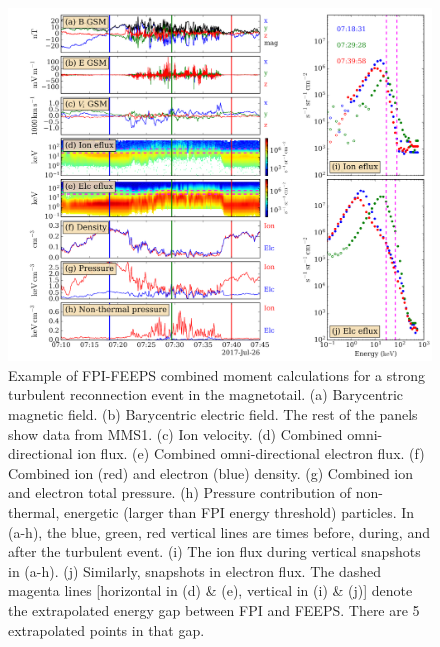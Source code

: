 \documentclass[draft]{agujournal2019}
\begin{document}
\begin{figure}
\centering
\noindent\includegraphics[width=\textwidth]{Fig1_fpi_feeps_combined_example.pdf}
\caption{
    Example of FPI-FEEPS combined moment calculations for a strong turbulent reconnection event in the magnetotail. (a) Barycentric magnetic field. (b) Barycentric electric field. The rest of the panels show data from MMS1. (c) Ion velocity. (d) Combined omni-directional ion  flux. (e) Combined omni-directional electron  flux. (f) Combined ion (red) and electron (blue) density. (g) Combined ion and electron total pressure. (h) Pressure contribution of non-thermal, energetic (larger than FPI energy threshold) particles. In (a-h), the blue, green, red vertical lines are times before, during, and after the turbulent event. (i) The ion  flux during vertical snapshots in (a-h). (j) Similarly, snapshots in electron  flux.  The dashed magenta lines [horizontal in (d) \& (e), vertical in (i) \& (j)] denote the extrapolated energy gap between FPI and FEEPS. There are 5 extrapolated points in that gap.
}
\label{fig:motivating_event}
\end{figure}
\end{document}
